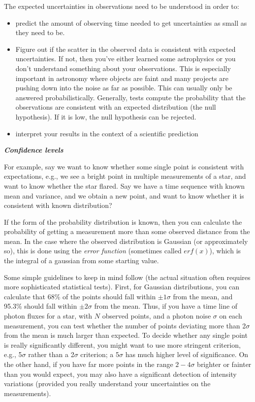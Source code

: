 \documentclass[12pt]{article}
\begin{document}
The expected uncertainties in observations need to be understood in
order to:
\begin{itemize}
    \item predict the amount of observing time needed to get
        uncertainties as small as they need to be.
    \item Figure out if the scatter in the observed data is consistent
        with expected uncertainties. If not, then
        you've either learned some astrophysics or you don't understand
        something about your observations. This is especially important in
        astronomy where objects are faint and many projects are pushing
        down into the noise as far as possible. This can usually only
        be answered probabilistically. Generally, tests compute the
        probability that the observations are consistent with an expected
        distribution (the null hypothesis). If it is low, the null
        hypothesis can be rejected.
    \item interpret your results in the context of a scientific prediction
\end{itemize}

\textbf{\emph{Confidence levels}}

For example, say we want to know whether some single point
is consistent with expectations, e.g., we see a bright point in
multiple measurements of a star, and want to know whether the star
flared. Say we have a time sequence with known mean and variance, and
we obtain a new point, and want to know whether it is consistent with
known distribution?

If the form of the probability distribution is known, then
you can calculate the probability of getting a measurement more than
some observed distance from the mean. In the case where the observed
distribution is Gaussian (or approximately so), this is done using the
\emph{error function} (sometimes called $erf(x)$), which is the integral of a
gaussian from some starting value.

Some simple guidelines to keep in mind follow (the actual
situation often requires more sophisticated statistical tests). First,
for Gaussian distributions, you can calculate that 68\% of the points
should fall within $\pm 1\sigma$ from the mean, and 95.3\%
should fall within $\pm 2\sigma$ from the mean. Thus, if you have a
time line of photon fluxes for a star, with $N$ observed points, and a
photon noise $\sigma$ on each measurement, you can test whether the
number of points deviating more than 2$\sigma$ from the mean is much
larger than expected. To decide whether any single point is really
significantly different, you might want to use more stringent
criterion, e.g., 5$\sigma$ rather than a 2$\sigma$ criterion;
a 5$\sigma$ has much higher level of significance. On the other hand, if
you have far more points in the range $2-4\sigma$ brighter or
fainter than you would expect, you may also have a significant
detection of intensity variations (provided you really understand your
uncertainties on the measurements).
\end{document}
